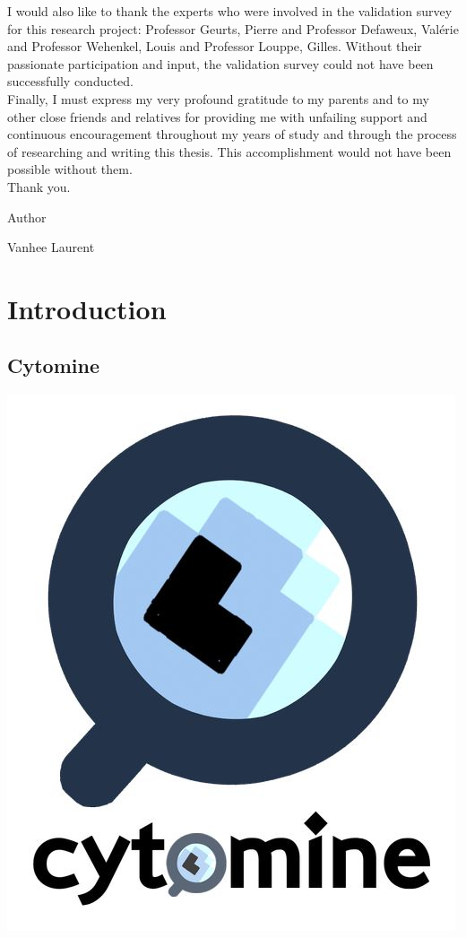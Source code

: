 \documentclass[a4paper,11pt]{report}
\numberwithin{figure}{chapter} %
\begin{document}
I would also like to thank the experts who were involved in the validation survey for this research project: Professor Geurts, Pierre and Professor Defaweux, Val\'{e}rie and Professor Wehenkel, Louis and Professor Louppe, Gilles.
Without their passionate participation and input, the validation survey could not have been successfully conducted.\\


Finally, I must express my very profound gratitude to my parents and to my other close friends and relatives for providing me with unfailing support and continuous encouragement throughout my years of study and through the process of researching and writing this thesis.
This accomplishment would not have been possible without them.\\
Thank you.

\vspace{1cm}

\noindent Author

\vspace{1cm}

\noindent Vanhee Laurent

\chapter{Introduction}


\section{Cytomine}

\begin{center}
    \includegraphics[scale=0.80]{images/logo_cytomine.jpg}
\end{center}
\end{document}
